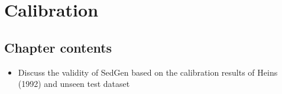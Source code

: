 \chapter{Calibration}\label{ch:calibration}

\section{Chapter contents}
\begin{itemize}
    \item Discuss the validity of SedGen based on the calibration results of Heins (1992) and unseen test dataset
\end{itemize}




\cleardoublepage

